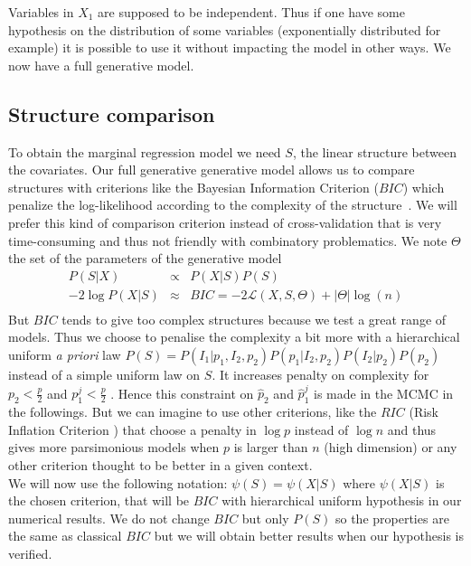 \documentclass[11pt,a4paper]{article}
\begin{document}
		Variables in $X_1$ are supposed to be independent.
	Thus if one have some hypothesis on the distribution of some variables (exponentially distributed for example) it is possible to use it without impacting the model in other ways. %
	We now have a full generative model.
	\subsection{Structure comparison} \label{compstruct}
  To obtain the marginal regression model we need $S$, the linear structure between the covariates.
	Our full generative generative model allows us to compare structures with criterions like the Bayesian Information Criterion ($BIC$) which penalize the log-likelihood according to the complexity of the structure~\cite{BIChuard}. We will prefer this kind of comparison criterion instead of cross-validation that is very time-consuming and thus not friendly with combinatory problematics.
	We note $\Theta$ the set of the parameters of the generative model
	\begin{eqnarray}
		P(S|X)&\propto& P(X|S)P(S) \\
		-2\log P(X|S)&\approx & BIC=-2\mathcal{L}(X,S,\Theta)+|\Theta|\log(n)\\  
	\end{eqnarray}
	But $BIC$ tends to give too complex structures because we test a great range of models. 
	Thus we choose to penalise the complexity a bit more with a hierarchical uniform {\it a priori} law $P(S)=P(I_1 | p_1,I_2,p_2)P(p_1|I_2,p_2)P(I_2|p_2)P(p_2)$  instead of a simple uniform law on $S$.
	It increases penalty on complexity for $p_2<\frac{p}{2}$ and $p_1^j<\frac{p}{2}$ . Hence %
	this constraint on $\hat{p}_2$ and $\hat{p}_1^j$ is made in the MCMC in the followings.
	But we can imagine to use other criterions, like the $RIC$ (Risk Inflation Criterion \cite{foster1994risk}) that choose a penalty in $\log p$ instead of $\log n$ and thus gives more parsimonious models when $p$ is larger than $n$ (high dimension) or any other criterion \cite{george1993variable} thought to be better in a given context. 
\\	
		We will now use the following notation: $\psi(S)=\psi(X|S)$	where $\psi(X|S)$ is the chosen criterion, that will be $BIC$ with hierarchical uniform hypothesis in our numerical results. We do not change $BIC$ but only $P(S)$ so the properties are the same as classical $BIC$ but we will obtain better results when our hypothesis is verified.
	
\end{document}
